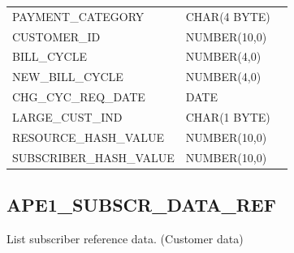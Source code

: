 \documentclass[12pt,twoside]{article}
\begin{document}
\begin{center}
\begin{tabular}{lll}
 PAYMENT\_CATEGORY        &  CHAR(4 BYTE)        &                        \\
 CUSTOMER\_ID             &  NUMBER(10,0)        &                        \\
 BILL\_CYCLE              &  NUMBER(4,0)         &                        \\
 NEW\_BILL\_CYCLE         &  NUMBER(4,0)         &                        \\
 CHG\_CYC\_REQ\_DATE      &  DATE                &                        \\
 LARGE\_CUST\_IND         &  CHAR(1 BYTE)        &                        \\
 RESOURCE\_HASH\_VALUE    &  NUMBER(10,0)        &                        \\
 SUBSCRIBER\_HASH\_VALUE  &  NUMBER(10,0)        &                        \\
\hline
\end{tabular}
\end{center}


\normalsize
 
\subsection{APE1\_SUBSCR\_DATA\_REF}
\label{sec-9-4}

   List subscriber reference data. (Customer data)
\scriptsize
\end{document}

